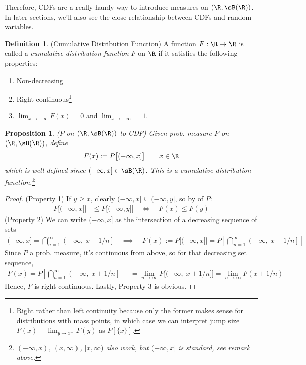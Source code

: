 \documentclass[12pt]{article}
\theoremstyle{plain}
\newtheorem{prop}[thm]{Proposition}
\theoremstyle{definition}
\newtheorem{defn}[thm]{Definition}
\theoremstyle{remark}
\newcommand{\ra}{\rightarrow}
\newcommand{\ninf}{_{n=1}^\infty}
\newcommand{\limn}{\lim_{n\rightarrow\infty}}
\begin{document}
Therefore, CDFs are a really handy way to introduce measures on
$(\R,\sB(\R))$. In later sections, we'll also see the close relationship
between CDFs and random variables.

\begin{defn}(Cumulative Distribution Function)
\label{defn:cdf}
A function $F:\R\ra\R$ is called a
\emph{cumulative distribution function} $F$ on $\R$ if it satisfies the
following properties:
\begin{enumerate}[label=(\roman*)]
  \item Non-decreasing
  \item Right continuous\footnote{%
      Right rather than left continuity because only the former makes
      sense for distributions with mass points, in which case we can
      interpret jump size $F(x)-\lim_{y\ra x^-}F(y)$ as $P[\{x\}]$.
    }
  \item $\lim_{x\ra-\infty} F(x)=0$ and $\lim_{x\ra+\infty}=1$.
\end{enumerate}
\end{defn}

\begin{prop}\emph{($P$ on $(\R,\sB(\R))$ to CDF)}
\label{prop:ptocdf}
Given prob. measure $P$ on $(\R,\sB(\R))$, define
\begin{align*}
  F(x) := P\big[(-\infty,x]\big]
  \qquad x\in\R
\end{align*}
which is well defined since $(-\infty,x]\in\sB(\R)$.
This is a cumulative distribution function.\footnote{%
  $(-\infty,x)$, $(x,\infty)$, $[x,\infty)$ also work, but $(-\infty,x]$
  is standard, see remark above.
}
\end{prop}
\begin{proof}
(Property 1)
If $y \geq x$, clearly $(-\infty,x]\subseteq (-\infty,y]$, so by of $P$:
\begin{align*}
  P\big[(-\infty,x]\big]
  &\leq
  P\big[(-\infty,y]\big]
  \quad\iff\quad
  F(x) \leq F(y)
\end{align*}
(Property 2)
We can write $(-\infty,x]$ as the intersection of a decreasing
sequence of sets
\begin{align*}
  (-\infty,x] = \bigcap\ninf \left(-\infty, \; x+1/n\right]
  \quad\implies\quad
  F(x) := P\big[(-\infty,x]\big]
    = P\left[\bigcap\ninf \left(-\infty, \; x+1/n\right]\right]
\end{align*}
Since $P$ a prob. measure, it's continuous from above, so for that
decreasing set sequence,
\begin{align*}
  F(x)
  = P\left[ \bigcap\ninf \left(-\infty, \; x+1/n\right] \right]
  &=\limn P\big[ (-\infty, \; x+1/n]\big]
  = \limn F(x+1/n)
\end{align*}
Hence, $F$ is right continuous.
Lastly, Property 3 is obvious.
\end{proof}
\end{document}
